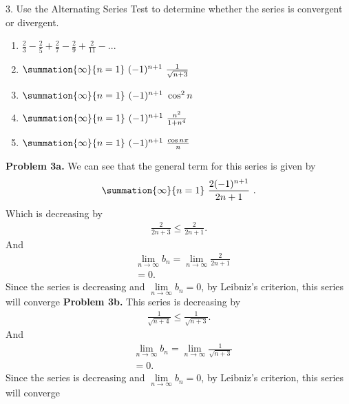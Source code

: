 \documentclass{report}
\begin{document}
    \pagebreak \bigbreak \noindent 
    \begin{mdframed}
        3. Use the Alternating Series Test to determine whether the series is convergent or divergent.
        \begin{enumerate}[label=(\alph*)]
            \item $\frac{2}{3} -\frac{2}{5} + \frac{2}{7} -\frac{2}{9} + \frac{2}{11} - ... $
            \item $\summation{\infty}{n=1}\ (-1)^{n+1}\ \frac{1}{\sqrt{n+3}} $
            \item $\summation{\infty}{n=1}\ (-1)^{n+1}\ \cos^{2}{n}$
            \item $\summation{\infty}{n=1}\ (-1)^{n+1}\ \frac{n^{2}}{1+n^{4}} $
            \item $\summation{\infty}{n=1}\ (-1)^{n+1}\ \frac{\cos{n\pi}}{n} $
        \end{enumerate}
    \end{mdframed}
    \bigbreak \noindent 
    \textbf{Problem 3a.} We can see that the general term for this series is given by
    \begin{align*}
        \summation{\infty}{n=1}\ \frac{2(-1)^{n+1}}{2n+1}\ 
    .\end{align*}
    \bigbreak \noindent 
    Which is decreasing by 
    \begin{align*}
        \frac{2}{2n+3} \leq \frac{2}{2n+1}
    .\end{align*}
    \bigbreak \noindent 
    And
    \begin{align*}
        &\lim\limits_{n \to \infty}{b_{n}} = \lim\limits_{n \to \infty}{\frac{2}{2n+1}} \\
        &=0
    .\end{align*}
    \bigbreak \noindent 
    Since the series is decreasing and $\lim\limits_{n \to \infty}{b_{n}} = 0$, by Leibniz's criterion, this series will converge
    \bigbreak \noindent 
    \textbf{Problem 3b.} This series is decreasing by 
    \begin{align*}
        \frac{1}{\sqrt{n+4}} \leq \frac{1}{\sqrt{n+3}}
    .\end{align*}
    And 
    \begin{align*}
        &\lim\limits_{n \to \infty}{b_{n}} = \lim\limits_{n \to \infty}{\frac{1}{\sqrt{n+3}}} \\
        &=0
    .\end{align*}
    Since the series is decreasing and $\lim\limits_{n \to \infty}{b_{n}} = 0$, by Leibniz's criterion, this series will converge
\end{document}
